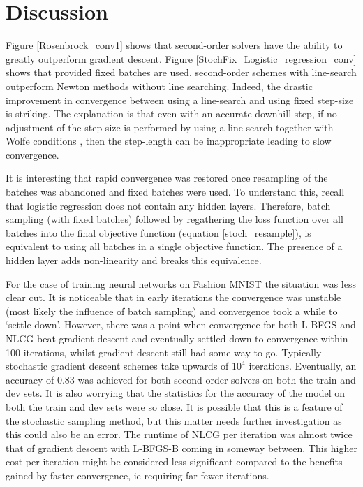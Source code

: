\documentclass[11pt,twocolumn]{article}
\begin{document}
\section{Discussion}

Figure \ref{Rosenbrock_conv1} shows that second-order solvers have the ability to greatly outperform gradient descent. Figure \ref{StochFix_Logistic_regression_conv} shows that provided fixed batches are used, second-order schemes with line-search outperform Newton methods without line searching. Indeed, the drastic improvement in convergence between using a line-search and using fixed step-size is striking. The explanation is that even with an accurate downhill step, if no adjustment of the step-size is performed by using a line search together with Wolfe conditions \citep[see][]{Nocedal:Wright}, then the step-length can be inappropriate leading to slow convergence. 
 
It is interesting that rapid convergence was restored once resampling of the batches was abandoned and fixed batches were used. To understand this, recall that logistic regression does not contain any hidden layers. Therefore, batch sampling (with fixed batches) followed by regathering the loss function over all batches into the final objective function (equation \ref{stoch_resample}), is equivalent to using all batches in a single objective function. The presence of a hidden layer adds non-linearity and breaks this equivalence.

For the case of training neural networks on Fashion MNIST the situation was less clear cut. It is noticeable that in early iterations the convergence was unstable (most likely the influence of batch sampling) and convergence took a while to `settle down'. However, there was a point when convergence for both L-BFGS and NLCG beat gradient descent and eventually settled down to convergence within 100 iterations, whilst gradient descent still had some way to go. Typically stochastic gradient descent schemes take upwards of $10^4$ iterations. Eventually, an accuracy of $0.83$ was achieved for both second-order solvers on both the train and dev sets. It is also worrying that the statistics for the accuracy of the model on both the train and dev sets were so close. It is possible that this is a feature of the stochastic sampling method, but this matter needs further investigation as this could also be an error. The runtime of NLCG per iteration was almost twice that of gradient descent with L-BFGS-B coming in someway between. This higher cost per iteration might be considered less significant compared to the benefits gained by faster convergence, ie requiring far fewer iterations.
\end{document}
